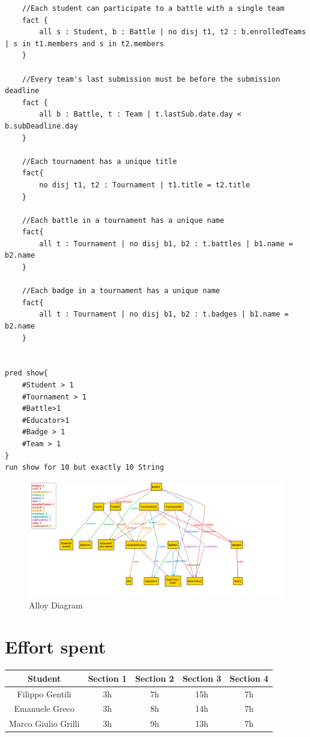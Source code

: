 \documentclass[12pt,oneside,a4paper]{article}
\begin{document}
\begin{lstlisting}
    //Each student can participate to a battle with a single team
    fact {
        all s : Student, b : Battle | no disj t1, t2 : b.enrolledTeams | s in t1.members and s in t2.members
    }

    //Every team's last submission must be before the submission deadline
    fact {
        all b : Battle, t : Team | t.lastSub.date.day < b.subDeadline.day
    }

    //Each tournament has a unique title
    fact{
        no disj t1, t2 : Tournament | t1.title = t2.title
    }
    
    //Each battle in a tournament has a unique name
    fact{
        all t : Tournament | no disj b1, b2 : t.battles | b1.name = b2.name
    }

    //Each badge in a tournament has a unique name
    fact{
        all t : Tournament | no disj b1, b2 : t.badges | b1.name = b2.name
    }


pred show{
	#Student > 1
	#Tournament > 1
	#Battle>1
	#Educator>1
	#Badge > 1
	#Team > 1
}
run show for 10 but exactly 10 String
\end{lstlisting}

\clearpage

\begin{figure}
    \centering
    \includegraphics[width=1\linewidth]{Images//Diagrams/Alloy.png}
    \caption{Alloy Diagram}
    \label{fig:enter-label}
\end{figure}

\clearpage

\section{Effort spent}
\begin{table}[H]
\centering
\begin{tabular}{|c|c|c|c|c|}
\hline
\textbf{Student} & \textbf{Section 1} & \textbf{Section 2} & \textbf{Section 3} & \textbf{Section 4} \\
\hline
Filippo Gentili & 3h & 7h & 15h & 7h \\
\hline
Emanuele Greco & 3h & 8h & 14h & 7h\\
\hline
Marco Giulio Grilli & 3h & 9h & 13h & 7h \\
\hline
\end{tabular}
\end{table}
\end{document}
